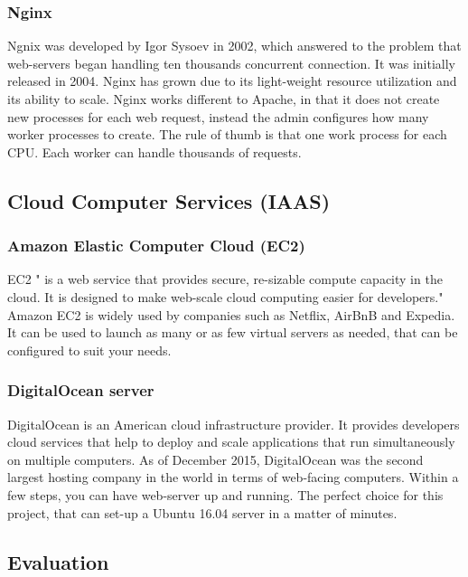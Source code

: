 \subsubsection{Nginx}
Ngnix \cite{nginx} was developed by Igor Sysoev in 2002, which answered to the problem that web-servers began handling ten thousands concurrent connection. It was initially released in 2004. Nginx has grown due to its light-weight resource utilization and its ability to scale. Nginx works different to Apache, in that it does not create new processes for each web request, instead the admin configures how many worker processes to create. The rule of thumb is that one work process for each CPU. Each worker can handle thousands of requests.

\subsection{Cloud Computer Services (IAAS)}

\subsubsection{Amazon Elastic Computer Cloud (EC2)}
EC2 " is a web service that provides secure, re-sizable compute capacity in the cloud. It is designed to make web-scale cloud computing easier for developers." \cite{ec2} Amazon EC2 is widely used by companies such as Netflix, AirBnB and Expedia. It can be used to launch as many or as few virtual servers as needed, that can be configured to suit your needs.

\subsubsection{DigitalOcean server}

DigitalOcean \cite{digital} is an American cloud infrastructure provider. It provides developers cloud services that help to deploy and scale applications that run simultaneously on multiple computers. As of December 2015, DigitalOcean was the second largest hosting company in the world in terms of web-facing computers. Within a few steps, you can have web-server up and running. The perfect choice for this project, that can set-up a Ubuntu 16.04 server in a matter of minutes. 

\newpage
\subsection{Evaluation}

